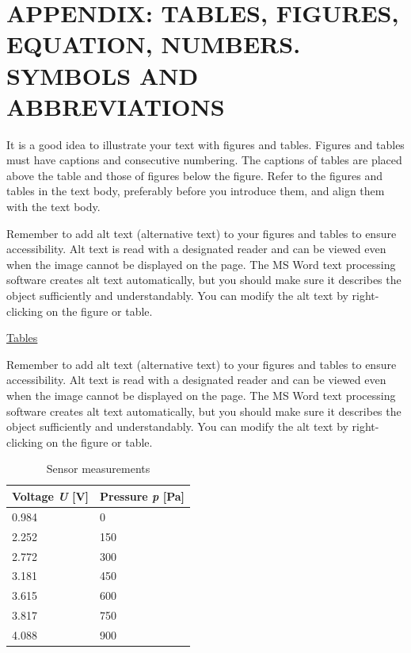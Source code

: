 \chapter{APPENDIX: TABLES, FIGURES, EQUATION, NUMBERS. SYMBOLS AND ABBREVIATIONS}
It is a good idea to illustrate your text with figures and tables. Figures and tables must have captions and consecutive numbering. The captions of tables are placed above the table and those of figures below the figure. Refer to the figures and tables in the text body, preferably before you introduce them, and align them with the text body.

Remember to add alt text (alternative text) to your figures and tables to ensure accessibility. Alt text is read with a designated reader and can be viewed even when the image cannot be displayed on the page. The MS Word text processing software creates alt text automatically, but you should make sure it describes the object sufficiently and understandably. You can modify the alt text by right-clicking on the figure or table.

\underline{Tables}

Remember to add alt text (alternative text) to your figures and tables to ensure accessibility. Alt text is read with a designated reader and can be viewed even when the image cannot be displayed on the page. The MS Word text processing software creates alt text automatically, but you should make sure it describes the object sufficiently and understandably. You can modify the alt text by right-clicking on the figure or table.

\begin{table}[!ht]
    \centering
    \vspace{1em}
    \caption{Sensor measurements}
    \begin{tabularx}{\textwidth}{|X|X|}
    	\hline
    	Voltage \textit{U} [V] & Pressure \textit{p} [Pa]\\
    	\hline
    	0.984 & 0\\
    	\hline
    	2.252 & 150\\
    	\hline
    	2.772 & 300\\
    	\hline
    	3.181 & 450\\
    	\hline
    	3.615 & 600\\
    	\hline
    	3.817 & 750\\
    	\hline
    	4.088 & 900\\
    	\hline
    \end{tabularx}
\end{table}

